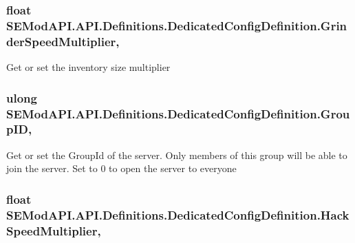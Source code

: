 \subsubsection[{Grinder\+Speed\+Multiplier}]{\setlength{\rightskip}{0pt plus 5cm}float S\+E\+Mod\+A\+P\+I.\+A\+P\+I.\+Definitions.\+Dedicated\+Config\+Definition.\+Grinder\+Speed\+Multiplier\hspace{0.3cm}{\ttfamily [get]}, {\ttfamily [set]}}\label{class_s_e_mod_a_p_i_1_1_a_p_i_1_1_definitions_1_1_dedicated_config_definition_a056c3c9b1759e8b0e4eea547488b85ef}


Get or set the inventory size multiplier 

\hypertarget{class_s_e_mod_a_p_i_1_1_a_p_i_1_1_definitions_1_1_dedicated_config_definition_a540f7d884501a817330a71c70b126438}{}
\subsubsection[{Group\+I\+D}]{\setlength{\rightskip}{0pt plus 5cm}ulong S\+E\+Mod\+A\+P\+I.\+A\+P\+I.\+Definitions.\+Dedicated\+Config\+Definition.\+Group\+I\+D\hspace{0.3cm}{\ttfamily [get]}, {\ttfamily [set]}}\label{class_s_e_mod_a_p_i_1_1_a_p_i_1_1_definitions_1_1_dedicated_config_definition_a540f7d884501a817330a71c70b126438}


Get or set the Group\+Id of the server. Only members of this group will be able to join the server. Set to 0 to open the server to everyone 

\hypertarget{class_s_e_mod_a_p_i_1_1_a_p_i_1_1_definitions_1_1_dedicated_config_definition_a0650151c1503943e42dca301cd22ac5a}{}
\subsubsection[{Hack\+Speed\+Multiplier}]{\setlength{\rightskip}{0pt plus 5cm}float S\+E\+Mod\+A\+P\+I.\+A\+P\+I.\+Definitions.\+Dedicated\+Config\+Definition.\+Hack\+Speed\+Multiplier\hspace{0.3cm}{\ttfamily [get]}, {\ttfamily [set]}}\label{class_s_e_mod_a_p_i_1_1_a_p_i_1_1_definitions_1_1_dedicated_config_definition_a0650151c1503943e42dca301cd22ac5a}


